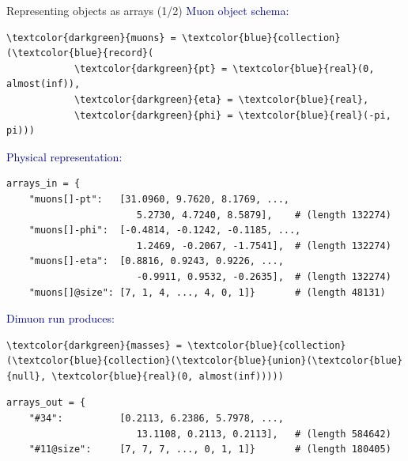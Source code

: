 \documentclass{beamer}
\begin{document}
\begin{frame}[fragile]{Representing objects as arrays (1/2)}
\vspace{0.3 cm}
\textcolor{darkblue}{\normalsize Muon object schema:}

\scriptsize
\begin{Verbatim}[commandchars=\\\{\}]
\textcolor{darkgreen}{muons} = \textcolor{blue}{collection}(\textcolor{blue}{record}(
            \textcolor{darkgreen}{pt} = \textcolor{blue}{real}(0, almost(inf)),
            \textcolor{darkgreen}{eta} = \textcolor{blue}{real},
            \textcolor{darkgreen}{phi} = \textcolor{blue}{real}(-pi, pi)))
\end{Verbatim}

\vspace{0.3 cm}
\textcolor{darkblue}{\normalsize Physical representation:}

\scriptsize
\begin{verbatim}
arrays_in = {
    "muons[]-pt":   [31.0960, 9.7620, 8.1769, ...,
                       5.2730, 4.7240, 8.5879],    # (length 132274)
    "muons[]-phi":  [-0.4814, -0.1242, -0.1185, ...,
                       1.2469, -0.2067, -1.7541],  # (length 132274)
    "muons[]-eta":  [0.8816, 0.9243, 0.9226, ...,
                       -0.9911, 0.9532, -0.2635],  # (length 132274)
    "muons[]@size": [7, 1, 4, ..., 4, 0, 1]}       # (length 48131)
\end{verbatim}

\vspace{0.3 cm}
\textcolor{darkblue}{\normalsize Dimuon run produces:}

\scriptsize
\begin{Verbatim}[commandchars=\\\{\}]
\textcolor{darkgreen}{masses} = \textcolor{blue}{collection}(\textcolor{blue}{collection}(\textcolor{blue}{union}(\textcolor{blue}{null}, \textcolor{blue}{real}(0, almost(inf)))))
\end{Verbatim}

\scriptsize
\begin{verbatim}
arrays_out = {
    "#34":          [0.2113, 6.2386, 5.7978, ...,
                       13.1108, 0.2113, 0.2113],   # (length 584642)
    "#11@size":     [7, 7, 7, ..., 0, 1, 1]}       # (length 180405)
\end{verbatim}
\end{frame}
\end{document}
